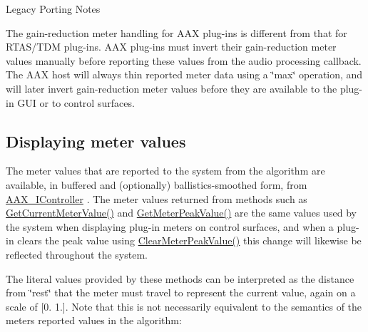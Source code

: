 \begin{DoxyRefDesc}{Legacy Porting Notes}
\item[\mbox{\hyperlink{a00787__porting_notes000001}{Legacy Porting Notes}}]The gain-\/reduction meter handling for A\+AX plug-\/ins is different from that for R\+T\+A\+S/\+T\+DM plug-\/ins. A\+AX plug-\/ins must invert their gain-\/reduction meter values manually before reporting these values from the audio processing callback. The A\+AX host will always thin reported meter data using a \char`\"{}max\char`\"{} operation, and will later invert gain-\/reduction meter values before they are available to the plug-\/in G\+UI or to control surfaces. \end{DoxyRefDesc}
\hypertarget{a00807_AdditionalFeatures_Meters_displaying}{}\subsection{Displaying meter values}\label{a00807_AdditionalFeatures_Meters_displaying}
The meter values that are reported to the system from the algorithm are available, in buffered and (optionally) ballistics-\/smoothed form, from \mbox{\hyperlink{a01789}{A\+A\+X\+\_\+\+I\+Controller}} . The meter values returned from methods such as \mbox{\hyperlink{a01789_a13de9cc4bb7fb3848fbe12622c033135}{Get\+Current\+Meter\+Value()}} and \mbox{\hyperlink{a01789_a85db3824256005c97689925750103765}{Get\+Meter\+Peak\+Value()}} are the same values used by the system when displaying plug-\/in meters on control surfaces, and when a plug-\/in clears the peak value using \mbox{\hyperlink{a01789_aa8fe057d2f53109e75662da0a492fa34}{Clear\+Meter\+Peak\+Value()}} this change will likewise be reflected throughout the system.

The literal values provided by these methods can be interpreted as the distance from \char`\"{}rest\char`\"{} that the meter must travel to represent the current value, again on a scale of \mbox{[}0. 1.\mbox{]}. Note that this is not necessarily equivalent to the semantics of the meter\textquotesingle{}s reported values in the algorithm\+:

